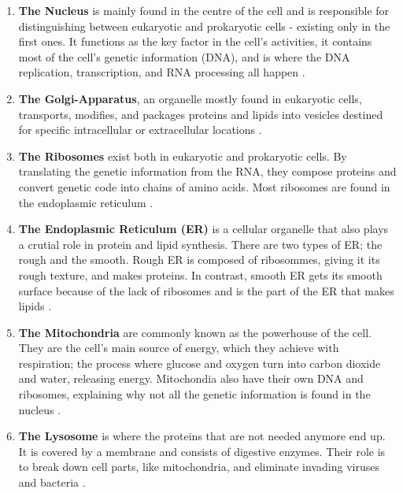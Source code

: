 \documentclass[class={myRUCProject}, crop=false]{standalone}
\begin{document}
\begin{enumerate}

    \item \textbf{The Nucleus} is mainly found in the centre of the cell and is responsible for distinguishing between eukaryotic and prokaryotic cells - existing only in the first ones. It functions as the key factor in the cell's activities, it contains most of the cell's genetic information (DNA), and is where the DNA replication, transcription, and RNA processing all happen \cite{organelleDef}.
    \item \textbf{The Golgi-Apparatus}, an organelle mostly found in eukaryotic cells, transports, modifies, and packages proteins and lipids into vesicles destined for specific intracellular or extracellular locations \cite{organelleDef}. 
    \item \textbf{The Ribosomes} exist both in eukaryotic and prokaryotic cells. By translating the genetic information from the RNA, they compose proteins and convert genetic code into chains of amino acids. Most ribosomes are found in the endoplasmic reticulum \cite{organelleDef}.
    \item \textbf{The Endoplasmic Reticulum (ER)} is a cellular organelle that also plays a crutial role in protein and lipid synthesis. There are two types of ER; the rough and the smooth. Rough ER is composed of ribosommes, giving it its rough texture, and makes proteins. In contrast, smooth ER gets its smooth surface because of the lack of ribosomes and is the part of the ER that makes lipids \cite{organelleDef}.
    \item \textbf{The Mitochondria} are commonly known as the powerhouse of the cell. They are the cell's main source of energy, which they achieve with respiration; the process where glucose and oxygen turn into carbon dioxide and water, releasing energy. Mitochondia also have their own DNA and ribosomes, explaining why not all the genetic information is found in the nucleus \cite{organelleDef}.
    \item \textbf{The Lysosome} is where the proteins that are not needed anymore end up. It is covered by a membrane and consists of digestive enzymes. Their role is to break down cell parts, like mitochondria, and eliminate invading viruses and bacteria \cite{lysosomeDef}.
  
\end{enumerate}
\end{document}
